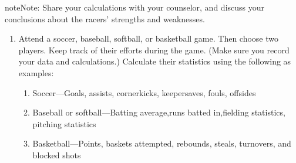 \documentclass[letterpaper,10pt,english]{sphinxmanual}
\begin{document}
\begin{sphinxadmonition}{note}{Note:}
Share your calculations with your counselor, and discuss your conclusions about the racers’ strengths and weaknesses.
\end{sphinxadmonition}
\begin{enumerate}
%
\setcounter{enumi}{2}
\item {} 
Attend a soccer, baseball, softball, or basketball game. Then choose two players. Keep track of their efforts during the game. (Make sure you record your data and calculations.) Calculate their statistics using the following as examples:
\begin{enumerate}
%
\item {} 
Soccer—Goals, assists, cornerkicks, keepersaves, fouls, offsides

\item {} 
Baseball or softball—Batting average,runs batted in,fielding statistics, pitching statistics

\item {} 
Basketball—Points, baskets attempted, rebounds, steals, turnovers, and blocked shots

\end{enumerate}

\end{enumerate}
\end{document}
